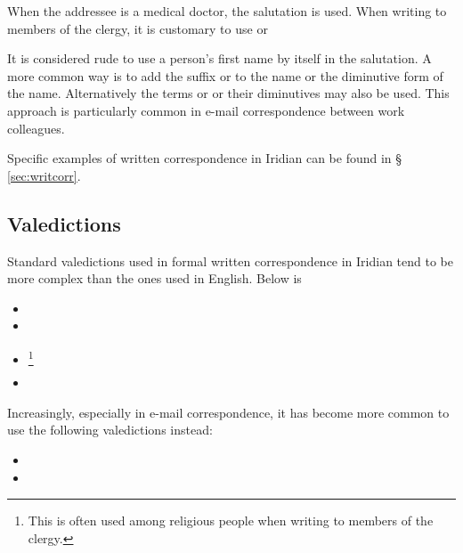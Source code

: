 When the addressee is a medical doctor, the salutation  is used. When writing to members of the clergy, it is customary to use  or 

It is considered rude to use a person's first name by itself in the salutation. A more common way is to add the suffix  or  to the name or the diminutive form of the name. Alternatively the terms  or  or their diminutives may also be used. This approach is particularly common in e-mail correspondence between work colleagues.

Specific examples of written correspondence in Iridian can be found in \S\,\ref{sec:writcorr}.

\subsection{Valedictions}

Standard valedictions used in formal written correspondence in Iridian tend to be more complex than the ones used in English. Below is 

\begin{itemize}[nosep]
	\item {}
	\item {}
	\item {}\footnote{This is often used among religious people when writing to members of the clergy.}
	\item {}

\end{itemize}

Increasingly, especially in e-mail correspondence, it has become more common to use the following valedictions instead:

\begin{itemize}[nosep]
	\item {}
	\item {}
\end{itemize}

